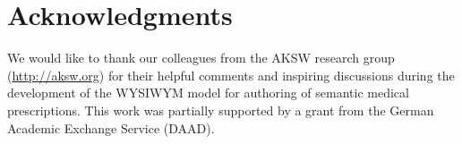 \documentclass[journal]{IEEEtran}
\begin{document}
\section*{Acknowledgments}
We would like to thank our colleagues from the AKSW research group (\url{http://aksw.org}) for their helpful comments and inspiring discussions during the development of the WYSIWYM model for authoring of semantic medical prescriptions.
This work was partially supported by a grant from the German Academic Exchange Service (DAAD).

\begin{spacing}{0.3}


\end{spacing}

\end{document}
